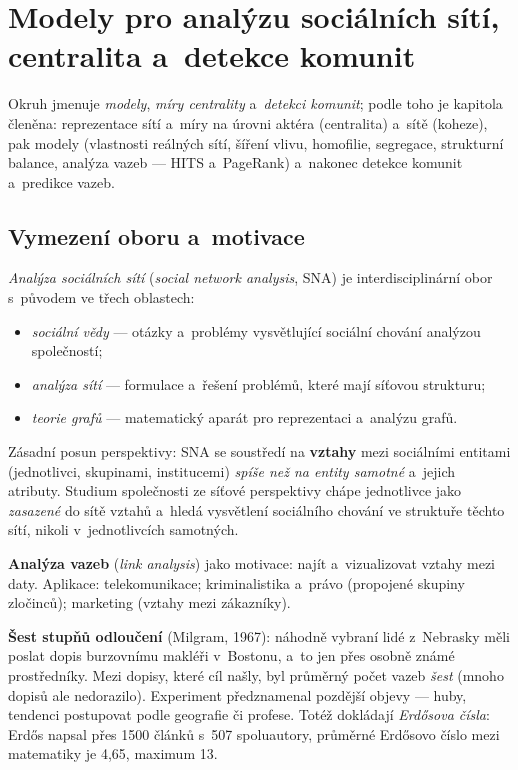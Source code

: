 \documentclass[11pt,a4paper]{article}
\theoremstyle{definition}
\begin{document}
\newpage
\section{Modely pro analýzu sociálních sítí, centralita a~detekce komunit}
\label{sec:sna}

Okruh jmenuje \emph{modely}, \emph{míry centrality} a~\emph{detekci komunit}; podle toho je
kapitola členěna: reprezentace sítí a~míry na úrovni aktéra (centralita) a~sítě (koheze), pak
modely (vlastnosti reálných sítí, šíření vlivu, homofilie, segregace, strukturní balance,
analýza vazeb --- HITS a~PageRank) a~nakonec detekce komunit a~predikce vazeb.

\subsection{Vymezení oboru a~motivace}

\begin{defbox}
\emph{Analýza sociálních sítí} (\emph{social network analysis}, SNA) je interdisciplinární
obor s~původem ve třech oblastech:
\begin{itemize}
\item \emph{sociální vědy} --- otázky a~problémy vysvětlující sociální chování analýzou
      společností;
\item \emph{analýza sítí} --- formulace a~řešení problémů, které mají síťovou strukturu;
\item \emph{teorie grafů} --- matematický aparát pro reprezentaci a~analýzu grafů.
\end{itemize}
Zásadní posun perspektivy: SNA se soustředí na \textbf{vztahy} mezi sociálními entitami
(jednotlivci, skupinami, institucemi) \emph{spíše než na entity samotné} a~jejich atributy.
Studium společnosti ze síťové perspektivy chápe jednotlivce jako \emph{zasazené} do sítě
vztahů a~hledá vysvětlení sociálního chování ve struktuře těchto sítí, nikoli v~jednotlivcích
samotných.
\end{defbox}

\textbf{Analýza vazeb} (\emph{link analysis}) jako motivace: najít a~vizualizovat vztahy mezi
daty. Aplikace: telekomunikace; kriminalistika a~právo (propojené skupiny zločinců); marketing
(vztahy mezi zákazníky).

\textbf{Šest stupňů odloučení} (Milgram, 1967): náhodně vybraní lidé z~Nebrasky měli poslat
dopis burzovnímu makléři v~Bostonu, a~to jen přes osobně známé prostředníky. Mezi dopisy, které
cíl našly, byl průměrný počet vazeb \emph{šest} (mnoho dopisů ale nedorazilo). Experiment
předznamenal pozdější objevy --- huby, tendenci postupovat podle geografie či profese. Totéž
dokládají \emph{Erdősova čísla}: Erdős napsal přes 1500 článků s~507 spoluautory, průměrné
Erdősovo číslo mezi matematiky je 4,65, maximum 13.
\end{document}
